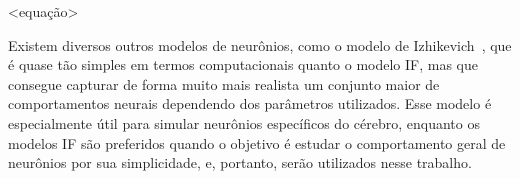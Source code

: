 
<equação>

Existem diversos outros modelos de neurônios, como o modelo de Izhikevich~\cite{izhikevichSimple2003}, que é quase tão simples em
termos computacionais quanto o modelo IF, mas que consegue capturar de forma muito mais realista um conjunto maior de
comportamentos neurais dependendo dos parâmetros utilizados. Esse modelo é especialmente útil para simular neurônios específicos
do cérebro, enquanto os modelos IF são preferidos quando o objetivo é estudar o comportamento geral de neurônios por sua
simplicidade, e, portanto, serão utilizados nesse trabalho.
